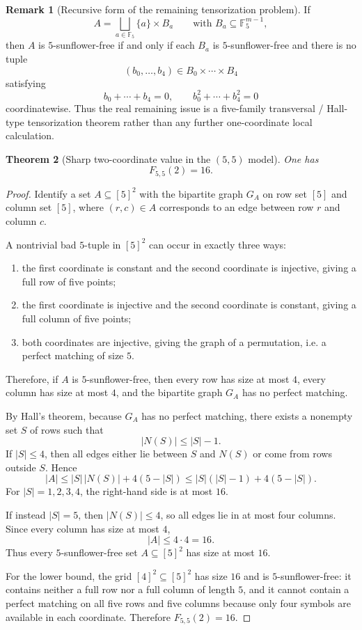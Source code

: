 \documentclass[11pt]{article}
\newtheorem{theorem}{Theorem}[section]
\theoremstyle{definition}
\newtheorem{remark}[theorem]{Remark}
\newcommand{\1}{\mathbf{1}}
\begin{document}
\begin{remark}[Recursive form of the remaining tensorization problem]\label{rem:555-recursive-obstacle}
If
\[
A=\bigsqcup_{a\in \mathbb F_5} \{a\}\times B_a
\qquad\text{with }B_a\subseteq \mathbb F_5^{m-1},
\]
then $A$ is $5$-sunflower-free if and only if each $B_a$ is $5$-sunflower-free and there is no tuple
\[
(b_0,\dots,b_4)\in B_0\times\cdots\times B_4
\]
satisfying
\[
b_0+\cdots+b_4=0,
\qquad
b_0^2+\cdots+b_4^2=0
\]
coordinatewise. Thus the real remaining issue is a five-family transversal / Hall-type tensorization theorem rather than any further one-coordinate local calculation.
\end{remark}


\begin{theorem}[Sharp two-coordinate value in the $(5,5)$ model]\label{thm:555-two-coordinate}
One has
\[
F_{5,5}(2)=16.
\]
\end{theorem}

\begin{proof}
Identify a set $A\subseteq [5]^2$ with the bipartite graph $G_A$ on row set $[5]$ and column set $[5]$, where $(r,c)\in A$ corresponds to an edge between row $r$ and column $c$.

A nontrivial bad $5$-tuple in $[5]^2$ can occur in exactly three ways:
\begin{enumerate}[label=(\alph*),leftmargin=2.2em]
\item the first coordinate is constant and the second coordinate is injective, giving a full row of five points;
\item the first coordinate is injective and the second coordinate is constant, giving a full column of five points;
\item both coordinates are injective, giving the graph of a permutation, i.e. a perfect matching of size $5$.
\end{enumerate}
Therefore, if $A$ is $5$-sunflower-free, then every row has size at most $4$, every column has size at most $4$, and the bipartite graph $G_A$ has no perfect matching.

By Hall's theorem, because $G_A$ has no perfect matching, there exists a nonempty set $S$ of rows such that
\[
|N(S)|\le |S|-1.
\]
If $|S|\le 4$, then all edges either lie between $S$ and $N(S)$ or come from rows outside $S$. Hence
\[
|A|\le |S|\,|N(S)| + 4(5-|S|)
\le |S|(|S|-1)+4(5-|S|).
\]
For $|S|=1,2,3,4$, the right-hand side is at most $16$.

If instead $|S|=5$, then $|N(S)|\le 4$, so all edges lie in at most four columns. Since every column has size at most $4$,
\[
|A|\le 4\cdot 4=16.
\]
Thus every $5$-sunflower-free set $A\subseteq [5]^2$ has size at most $16$.

For the lower bound, the grid $[4]^2\subseteq [5]^2$ has size $16$ and is $5$-sunflower-free: it contains neither a full row nor a full column of length $5$, and it cannot contain a perfect matching on all five rows and five columns because only four symbols are available in each coordinate. Therefore $F_{5,5}(2)=16$.
\end{proof}
\end{document}
